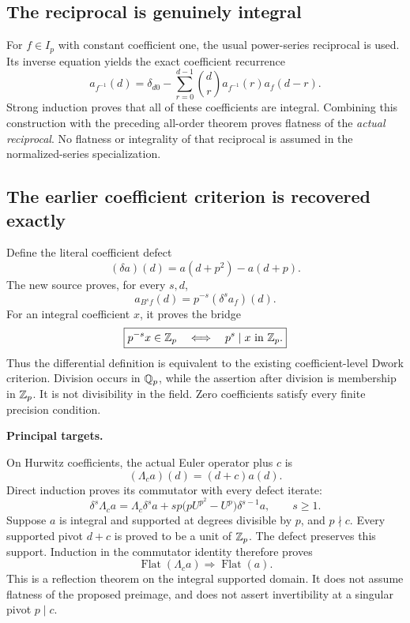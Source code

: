 \subsection*{The reciprocal is genuinely integral}
For $f\in I_p$ with constant coefficient one, the usual power-series reciprocal is used. Its inverse equation yields the exact coefficient recurrence
\[
 a_{f^{-1}}(d)=\delta_{d0}-\sum_{r=0}^{d-1}
     \binom dr a_{f^{-1}}(r)a_f(d-r).
\]
Strong induction proves that all of these coefficients are integral. Combining this construction with the preceding all-order theorem proves flatness of the \emph{actual reciprocal}. No flatness or integrality of that reciprocal is assumed in the normalized-series specialization.

\subsection*{The earlier coefficient criterion is recovered exactly}
Define the literal coefficient defect
\[
 (\delta a)(d)=a(d+p^2)-a(d+p).
\]
The new source proves, for every $s,d$,
\[
 a_{B^s f}(d)=p^{-s}(\delta^s a_f)(d).
\]
For an integral coefficient $x$, it proves the bridge
\[
\boxed{p^{-s}x\in\mathbb Z_p\quad\Longleftrightarrow\quad p^s\mid x\text{ in }\mathbb Z_p.}
\]
Thus the differential definition is equivalent to the existing coefficient-level Dwork criterion. Division occurs in $\mathbb Q_p$, while the assertion after division is membership in $\mathbb Z_p$. It is not divisibility in the field. Zero coefficients satisfy every finite precision condition.

\textbf{Principal targets.}\par
{}\par
{}\par
{}\par
{}

\par\medskip
{}
On Hurwitz coefficients, the actual Euler operator plus $c$ is
\[
 (\Lambda_c a)(d)=(d+c)a(d).
\]
Direct induction proves its commutator with every defect iterate:
\[
 \delta^s\Lambda_c a
 =\Lambda_c\delta^s a
  +sp\bigl(pU^{p^2}-U^p\bigr)\delta^{s-1}a,
 \qquad s\ge1.
\]
Suppose $a$ is integral and supported at degrees divisible by $p$, and $p\nmid c$. Every supported pivot $d+c$ is proved to be a unit of $\mathbb Z_p$. The defect preserves this support. Induction in the commutator identity therefore proves
\[
 \operatorname{Flat}(\Lambda_c a)\Longrightarrow\operatorname{Flat}(a).
\]
This is a reflection theorem on the integral supported domain. It does not assume flatness of the proposed preimage, and does not assert invertibility at a singular pivot $p\mid c$.

